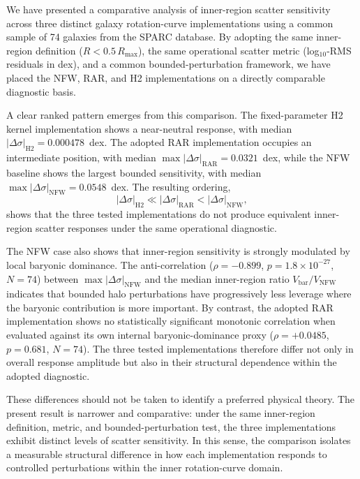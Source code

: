 \documentclass[fleqn,usenatbib]{mnras}
\begin{document}
We have presented a comparative analysis of inner-region scatter sensitivity across three distinct galaxy rotation-curve implementations using a common sample of 74 galaxies from the SPARC database. By adopting the same inner-region definition ($R < 0.5\,R_{\max}$), the same operational scatter metric (log$_{10}$-RMS residuals in dex), and a common bounded-perturbation framework, we have placed the NFW, RAR, and H2 implementations on a directly comparable diagnostic basis.

A clear ranked pattern emerges from this comparison. The fixed-parameter H2 kernel implementation shows a near-neutral response, with median $|\Delta \sigma|_{\mathrm{H2}} = 0.000478$~dex. The adopted RAR implementation occupies an intermediate position, with median $\max |\Delta \sigma|_{\mathrm{RAR}} = 0.0321$~dex, while the NFW baseline shows the largest bounded sensitivity, with median $\max |\Delta \sigma|_{\mathrm{NFW}} = 0.0548$~dex. The resulting ordering,
\[
|\Delta \sigma|_{\mathrm{H2}} \ll |\Delta \sigma|_{\mathrm{RAR}} < |\Delta \sigma|_{\mathrm{NFW}},
\]
shows that the three tested implementations do not produce equivalent inner-region scatter responses under the same operational diagnostic.

The NFW case also shows that inner-region sensitivity is strongly modulated by local baryonic dominance. The anti-correlation ($\rho = -0.899$, $p = 1.8\times10^{-27}$, $N=74$) between $\max |\Delta \sigma|_{\mathrm{NFW}}$ and the median inner-region ratio $V_{\mathrm{bar}}/V_{\mathrm{NFW}}$ indicates that bounded halo perturbations have progressively less leverage where the baryonic contribution is more important. By contrast, the adopted RAR implementation shows no statistically significant monotonic correlation when evaluated against its own internal baryonic-dominance proxy ($\rho = +0.0485$, $p = 0.681$, $N = 74$). The three tested implementations therefore differ not only in overall response amplitude but also in their structural dependence within the adopted diagnostic.

These differences should not be taken to identify a preferred physical theory. The present result is narrower and comparative: under the same inner-region definition, metric, and bounded-perturbation test, the three implementations exhibit distinct levels of scatter sensitivity. In this sense, the comparison isolates a measurable structural difference in how each implementation responds to controlled perturbations within the inner rotation-curve domain.
\end{document}
